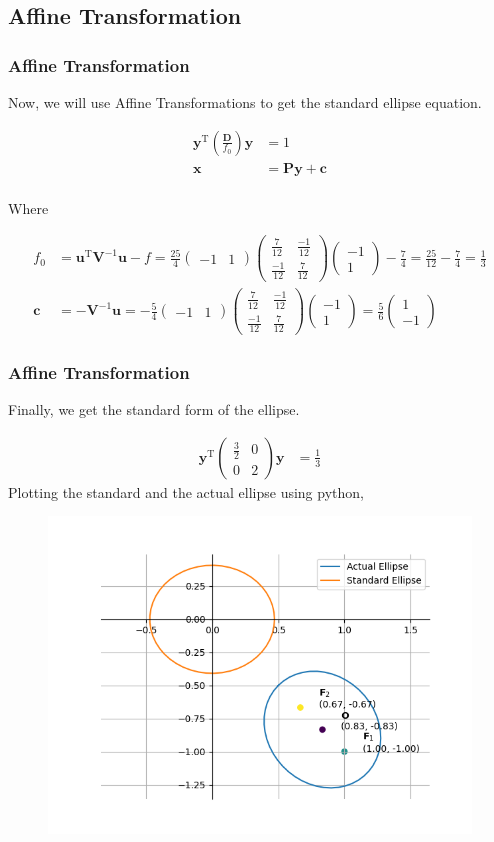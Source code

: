 \documentclass{beamer}
\providecommand{\brak}[1]{\ensuremath{\left(#1\right)}}
\theoremstyle{remark}
\newcommand{\myvec}[1]{\ensuremath{\begin{pmatrix}#1\end{pmatrix}}}
\let\vec\mathbf
\numberwithin{equation}{section}
\begin{document}
\subsection{Affine Transformation}
\begin{frame}
	\frametitle{Affine Transformation}
	Now, we will use Affine Transformations to get the standard ellipse equation.
	
	\begin{align}
		\vec{y}^\text{T}\brak{\frac{\vec{D}}{f_0}}\vec{y} &= 1\\
		\vec{x} &= \vec{Py} + \vec{c} \label{t1}\\
	\end{align}
	
	Where 
	
	\begin{align}
		f_0 &= \vec{u}^\text{T}\vec{V}^{-1}\vec{u} - f  = \frac{25}{4} \myvec{-1 & 1} \myvec{\frac{7}{12} & \frac{-1}{12} \\ \frac{-1}{12} & \frac{7}{12}}  \myvec{-1 \\ 1}  - \frac{7}{4}= \frac{25}{12} -  \frac{7}{4} = \frac{1}{3}\\
		\vec{c} &= -\vec{V}^{-1}\vec{u} = -\frac{5}{4}  \myvec{-1 & 1} \myvec{\frac{7}{12} & \frac{-1}{12} \\ \frac{-1}{12} & \frac{7}{12}}\myvec{ -1 \\ 1} = \frac{5}{6}  \myvec{ 1 \\ -1}
	\end{align}
\end{frame}
\begin{frame}
	\frametitle{Affine Transformation}
	Finally, we get the standard form of the ellipse.
	
	\begin{align}
		\vec{y}^\text{T}\myvec{\frac{3}{2} & 0 \\ 0 & 2}\vec{y} &= \frac{1}{3}
	\end{align}
	Plotting the standard and the actual ellipse using python,
	
	\begin{figure}[H]
		\centering
		\includegraphics[width=0.7\columnwidth]{figs/fig1.png} 
		\caption{}
		\label{fig1}
	\end{figure} 
\end{frame}
\end{document}
